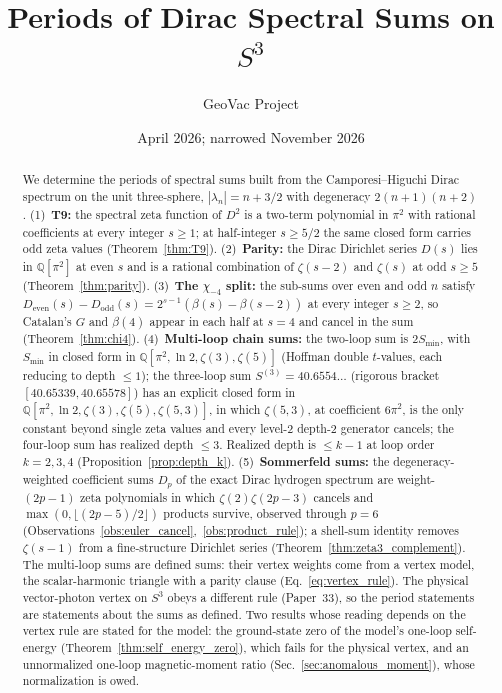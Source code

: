 \documentclass[11pt]{article}
\title{Periods of Dirac Spectral Sums on $S^3$}
\author{GeoVac Project}
\date{April 2026; narrowed November 2026}
\begin{document}
\maketitle

\begin{abstract}
We determine the periods of spectral sums built from the
Camporesi--Higuchi Dirac spectrum on the unit three-sphere,
$|\lambda_n| = n + 3/2$ with degeneracy $2(n+1)(n+2)$.
(1)~\textbf{T9:} the spectral zeta function of $D^2$ is a two-term
polynomial in $\pi^2$ with rational coefficients at every integer
$s \ge 1$; at half-integer $s \ge 5/2$ the same closed form carries odd
zeta values (Theorem~\ref{thm:T9}).
(2)~\textbf{Parity:} the Dirac Dirichlet series $D(s)$ lies in
$\mathbb{Q}[\pi^2]$ at even $s$ and is a rational combination of
$\zeta(s{-}2)$ and $\zeta(s)$ at odd $s \ge 5$ (Theorem~\ref{thm:parity}).
(3)~\textbf{The $\chi_{-4}$ split:} the sub-sums over even and odd $n$
satisfy $D_{\mathrm{even}}(s) - D_{\mathrm{odd}}(s) =
2^{s-1}(\beta(s) - \beta(s{-}2))$ at every integer $s \ge 2$, so Catalan's
$G$ and $\beta(4)$ appear in each half at $s = 4$ and cancel in the sum
(Theorem~\ref{thm:chi4}).
(4)~\textbf{Multi-loop chain sums:} the two-loop sum is $2S_{\min}$, with
$S_{\min}$ in closed form in $\mathbb{Q}[\pi^2, \ln 2, \zeta(3),
\zeta(5)]$ (Hoffman double $t$-values, each reducing to depth $\le 1$);
the three-loop sum $S^{(3)} = 40.6554\ldots$ (rigorous bracket
$[40.65339, 40.65578]$) has an explicit closed form in
$\mathbb{Q}[\pi^2, \ln 2, \zeta(3), \zeta(5), \zeta(5,3)]$, in which
$\zeta(5,3)$, at coefficient $6\pi^2$, is the only constant beyond
single zeta values and every level-2 depth-2 generator cancels; the
four-loop sum has realized depth $\le 3$.  Realized depth is $\le k-1$
at loop order $k = 2, 3, 4$ (Proposition~\ref{prop:depth_k}).
(5)~\textbf{Sommerfeld sums:} the degeneracy-weighted coefficient sums
$D_p$ of the exact Dirac hydrogen spectrum are weight-$(2p{-}1)$ zeta
polynomials in which $\zeta(2)\zeta(2p{-}3)$ cancels and
$\max(0, \lfloor(2p{-}5)/2\rfloor)$ products survive, observed through
$p = 6$ (Observations~\ref{obs:euler_cancel},~\ref{obs:product_rule});
a shell-sum identity removes $\zeta(s{-}1)$ from a fine-structure
Dirichlet series (Theorem~\ref{thm:zeta3_complement}).
The multi-loop sums are defined sums: their vertex weights come from a
vertex model, the scalar-harmonic triangle with a parity clause
(Eq.~\eqref{eq:vertex_rule}).  The physical vector-photon vertex on
$S^3$ obeys a different rule (Paper~33), so the period statements are
statements about the sums as defined.  Two results whose reading depends
on the vertex rule are stated for the model: the ground-state zero of
the model's one-loop self-energy (Theorem~\ref{thm:self_energy_zero}),
which fails for the physical vertex, and an unnormalized one-loop
magnetic-moment ratio (Sec.~\ref{sec:anomalous_moment}), whose
normalization is owed.
\end{abstract}
\end{document}
